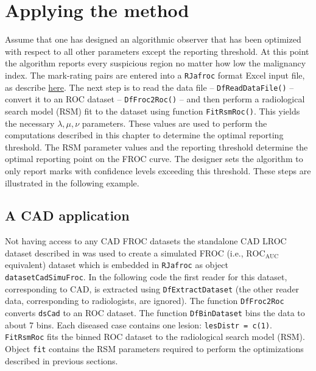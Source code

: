\documentclass[
]{book}
\begin{document}
\hypertarget{optim-op-point-how-to-use-method}{%
\section{Applying the method}\label{optim-op-point-how-to-use-method}}

Assume that one has designed an algorithmic observer that has been optimized with respect to all other parameters except the reporting threshold. At this point the algorithm reports every suspicious region no matter how low the malignancy index. The mark-rating pairs are entered into a \texttt{RJafroc} format Excel input file, as describe \href{https://dpc10ster.github.io/RJafrocQuickStart/quick-start-froc-data-format.html}{here}. The next step is to read the data file -- \texttt{DfReadDataFile()} -- convert it to an ROC dataset -- \texttt{DfFroc2Roc()} -- and then perform a radiological search model (RSM) fit to the dataset using function \texttt{FitRsmRoc()}. This yields the necessary \(\lambda, \mu, \nu\) parameters. These values are used to perform the computations described in this chapter to determine the optimal reporting threshold. The RSM parameter values and the reporting threshold determine the optimal reporting point on the FROC curve. The designer sets the algorithm to only report marks with confidence levels exceeding this threshold. These steps are illustrated in the following example.

\hypertarget{optim-op-point-application}{%
\subsection{A CAD application}\label{optim-op-point-application}}

Not having access to any CAD FROC datasets the standalone CAD LROC dataset described in \citep{hupse2013standalone} was used to create a simulated FROC (i.e., \(\text{ROC}_\text{AUC}\) equivalent) dataset which is embedded in \texttt{RJafroc} as object \texttt{datasetCadSimuFroc}. In the following code the first reader for this dataset, corresponding to CAD, is extracted using \texttt{DfExtractDataset} (the other reader data, corresponding to radiologists, are ignored). The function \texttt{DfFroc2Roc} converts \texttt{dsCad} to an ROC dataset. The function \texttt{DfBinDataset} bins the data to about 7 bins. Each diseased case contains one lesion: \texttt{lesDistr\ =\ c(1)}. \texttt{FitRsmRoc} fits the binned ROC dataset to the radiological search model (RSM). Object \texttt{fit} contains the RSM parameters required to perform the optimizations described in previous sections.
\end{document}
